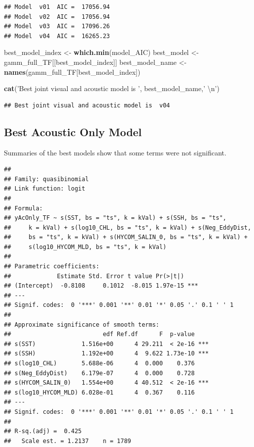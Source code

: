\documentclass[11pt,]{article}
\newenvironment{Shaded}{\begin{snugshade}}{\end{snugshade}}
\newcommand{\KeywordTok}[1]{\textcolor[rgb]{0.13,0.29,0.53}{\textbf{{#1}}}}
\newcommand{\CharTok}[1]{\textcolor[rgb]{0.31,0.60,0.02}{{#1}}}
\newcommand{\StringTok}[1]{\textcolor[rgb]{0.31,0.60,0.02}{{#1}}}
\newcommand{\NormalTok}[1]{{#1}}
\begin{document}
\begin{verbatim}
## Model  v01  AIC =  17056.94 
## Model  v02  AIC =  17056.94 
## Model  v03  AIC =  17096.26 
## Model  v04  AIC =  16265.23
\end{verbatim}

\begin{Shaded}
\begin{Highlighting}[]
\NormalTok{best_model_index <-}\StringTok{ }\KeywordTok{which.min}\NormalTok{(model_AIC)}
\NormalTok{best_model <-}\StringTok{ }\NormalTok{gamm_full_TF[[best_model_index]]}
\NormalTok{best_model_name <-}\StringTok{ }\KeywordTok{names}\NormalTok{(gamm_full_TF[best_model_index])}


\KeywordTok{cat}\NormalTok{(}\StringTok{'Best joint visual and acoustic model is '}\NormalTok{, best_model_name,}\StringTok{' }\CharTok{\textbackslash{}n}\StringTok{'}\NormalTok{)}
\end{Highlighting}
\end{Shaded}

\begin{verbatim}
## Best joint visual and acoustic model is  v04
\end{verbatim}

\subsection{Best Acoustic Only Model}\label{best-acoustic-only-model}

Summaries of the best models show that some terms were not significant.

\begin{Shaded}
\end{Shaded}

\begin{verbatim}
## 
## Family: quasibinomial 
## Link function: logit 
## 
## Formula:
## yAcOnly_TF ~ s(SST, bs = "ts", k = kVal) + s(SSH, bs = "ts", 
##     k = kVal) + s(log10_CHL, bs = "ts", k = kVal) + s(Neg_EddyDist, 
##     bs = "ts", k = kVal) + s(HYCOM_SALIN_0, bs = "ts", k = kVal) + 
##     s(log10_HYCOM_MLD, bs = "ts", k = kVal)
## 
## Parametric coefficients:
##             Estimate Std. Error t value Pr(>|t|)    
## (Intercept)  -0.8108     0.1012  -8.015 1.97e-15 ***
## ---
## Signif. codes:  0 '***' 0.001 '**' 0.01 '*' 0.05 '.' 0.1 ' ' 1
## 
## Approximate significance of smooth terms:
##                          edf Ref.df      F  p-value    
## s(SST)             1.516e+00      4 29.211  < 2e-16 ***
## s(SSH)             1.192e+00      4  9.622 1.73e-10 ***
## s(log10_CHL)       5.688e-06      4  0.000    0.376    
## s(Neg_EddyDist)    6.179e-07      4  0.000    0.728    
## s(HYCOM_SALIN_0)   1.554e+00      4 40.512  < 2e-16 ***
## s(log10_HYCOM_MLD) 6.028e-01      4  0.367    0.116    
## ---
## Signif. codes:  0 '***' 0.001 '**' 0.01 '*' 0.05 '.' 0.1 ' ' 1
## 
## R-sq.(adj) =  0.425   
##   Scale est. = 1.2137    n = 1789
\end{verbatim}
\end{document}
